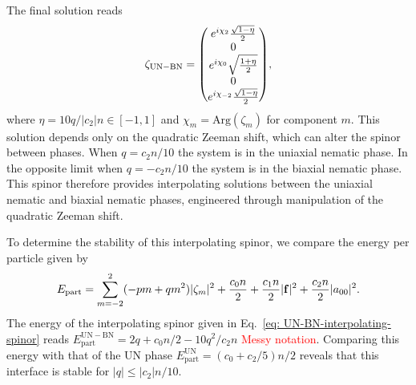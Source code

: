 The final solution reads
\begin{equation}\label{eq: UN-BN-interpolating-spinor}
    \zeta_\mathrm{UN-BN} = \mqty(
    e^{i\chi_2}\frac{\sqrt{1 - \eta}}{2} \\
    0 \\
    e^{i\chi_0}\sqrt{\frac{1 + \eta}{2}} \\
    0 \\
    e^{i\chi_{-2}}\frac{\sqrt{1 - \eta}}{2}
    ),
\end{equation}
where \(\eta = 10q /|c_2|n \in [-1, 1]\) and \(\chi_m = \text{Arg}(\zeta_m)\)
for component \(m\).
This solution depends only on the quadratic Zeeman shift, which can alter the
spinor between phases.
When \(q = c_2n / 10\) the system is in the uniaxial nematic phase.
In the opposite limit when \(q = -c_2n/10\) the system is in the biaxial
nematic phase.
This spinor therefore provides interpolating solutions between the uniaxial
nematic and biaxial nematic phases, engineered through manipulation of the
quadratic Zeeman shift.

To determine the stability of this interpolating spinor, we compare the energy
per particle given by~\cite{Kawaguchi2012}
\begin{equation}
    E_\mathrm{part} = \sum_{m=-2}^{2}(-pm + qm^2)|\zeta_m|^2 + \frac{c_0n}{2}
    + \frac{c_1n}{2}|\vb{f}|^2 + \frac{c_2n}{2}|a_{00}|^2.
\end{equation}
The energy of the interpolating spinor given in
Eq.~\eqref{eq: UN-BN-interpolating-spinor} reads
\(E^\mathrm{UN-BN}_\mathrm{part} = 2q + c_0n/2 - 10q^2/c_2n\)
\textcolor{red}{Messy notation}.
Comparing this energy with that of the UN phase
\(E^\mathrm{UN}_\mathrm{part} = (c_0+c_2/5)n/2\) reveals that this interface is
stable for \(|q| \leq |c_2|n/10\).

